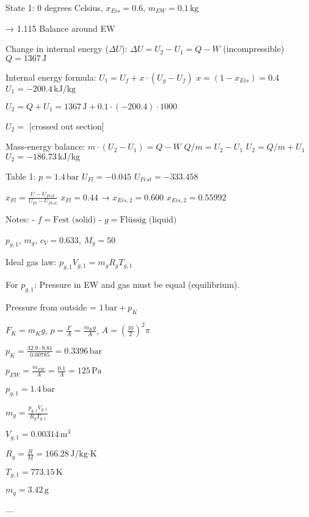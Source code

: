 State 1: 0 degrees Celsius, \( x_{Eis} = 0.6 \), \( m_{EW} = 0.1 \, \text{kg} \)  

→ 1.115 Balance around EW  

Change in internal energy (\( \Delta U \)):  
\( \Delta U = U_2 - U_1 = Q - W \) (incompressible)  
\( Q = 1367 \, \text{J} \)  

Internal energy formula:  
\( U_1 = U_f + x \cdot (U_g - U_f) \)  
\( x = (1 - x_{Eis}) = 0.4 \)  
\( U_1 = -200.4 \, \text{kJ/kg} \)  

\( U_2 = Q + U_1 = 1367 \, \text{J} + 0.1 \cdot (-200.4) \cdot 1000 \)  

\( U_2 = \) [crossed out section]  

Mass-energy balance:  
\( m \cdot (U_2 - U_1) = Q - W \)  
\( Q / m = U_2 - U_1 \)  
\( U_2 = Q / m + U_1 \)  
\( U_2 = -186.73 \, \text{kJ/kg} \)  

Table 1:  
\( p = 1.4 \, \text{bar} \)  
\( U_{Fl} = -0.045 \)  
\( U_{Fest} = -333.458 \)  

\( x_{Fl} = \frac{U - U_{Fest}}{U_{Fl} - U_{Fest}} \)  
\( x_{Fl} = 0.44 \) → \( x_{Eis,2} = 0.600 \)  
\( x_{Eis,2} = 0.55992 \)  

Notes:  
- \( f = \text{Fest (solid)} \)  
- \( g = \text{Flüssig (liquid)} \)

\( p_{g,1} \), \( m_g \), \( c_V = 0.633 \), \( M_g = 50 \)  

Ideal gas law:  
\( p_{g,1} V_{g,1} = m_g R_g T_{g,1} \)  

For \( p_{g,1} \): Pressure in EW and gas must be equal (equilibrium).  

Pressure from outside = \( 1 \, \text{bar} + p_K \)  

\( F_K = m_K g \), \( p = \frac{F}{A} = \frac{m_K g}{A} \), \( A = \left(\frac{10}{2}\right)^2 \pi \)  

\( p_K = \frac{32.9 \cdot 9.81}{0.00785} = 0.3396 \, \text{bar} \)  

\( p_{EW} = \frac{m_{EW}}{A} = \frac{0.1}{A} = 125 \, \text{Pa} \)  

\( p_{g,1} = 1.4 \, \text{bar} \)  

\( m_g = \frac{p_{g,1} V_{g,1}}{R_g T_{g,1}} \)  

\( V_{g,1} = 0.00314 \, \text{m}^3 \)  

\( R_g = \frac{R}{M} = 166.28 \, \text{J/kg·K} \)  

\( T_{g,1} = 773.15 \, \text{K} \)  

\( m_g = 3.42 \, \text{g} \)  

---